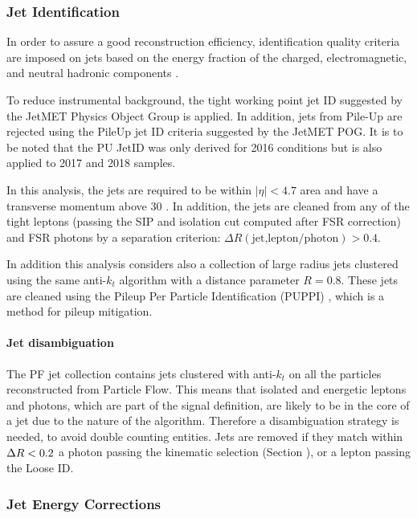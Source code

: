\subsubsection{Jet Identification}

In order to assure a good reconstruction efficiency, identification quality criteria are imposed on jets based on
the energy fraction of the charged, electromagnetic, and neutral hadronic components \cite{CMS-PAS-JME-16-003}.

To reduce instrumental background, the tight working point jet ID suggested by the JetMET Physics Object Group is applied.%
In addition, jets from Pile-Up are rejected using the PileUp jet ID criteria suggested by the JetMET POG.%
It is to be noted that the PU JetID was only derived for 2016 conditions but is also applied to 2017 and 2018 samples. 

In this analysis, the jets are required to be within $|\eta| < 4.7$ area and have a transverse momentum above 30 \GeV. 
In addition, the jets are cleaned from any of the tight leptons (passing the SIP and isolation cut computed after FSR correction) 
and FSR photons by a separation criterion: $\Delta R(\text{jet,lepton/photon}) > 0.4$.

In addition this analysis considers also a collection of large radius jets clustered using the same anti-$k_t$ algorithm with a distance parameter $R = 0.8$.
These jets are cleaned using the Pileup Per Particle Identification (PUPPI) \cite{Bertolini_2014}, which is a method for pileup mitigation.

\paragraph{Jet disambiguation\\}
The PF jet collection contains jets clustered with anti-$k_t$ on all the particles reconstructed from Particle Flow.
This means that isolated and energetic leptons and photons, which are part of the signal definition,
are likely to be in the core of a jet due to the nature of the algorithm.
Therefore a disambiguation strategy is needed, to avoid double counting entities.
Jets are removed if they match within $\Delta R < 0.2$ a photon passing the kinematic selection (Section ),
or a lepton passing the Loose ID.

\subsubsection{Jet Energy Corrections}

